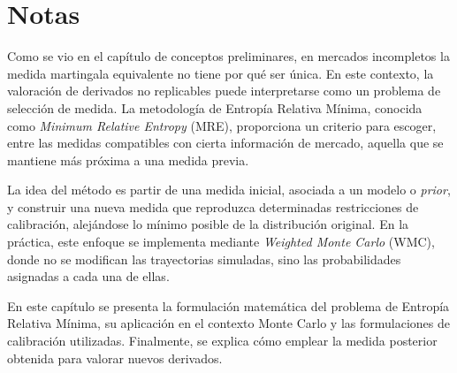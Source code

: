 \chapter{Notas}


Como se vio en el capítulo de conceptos preliminares, en mercados incompletos la medida martingala equivalente no tiene por qué ser única. En este contexto, la valoración de derivados no replicables puede interpretarse como un problema de selección de medida. La metodología de Entropía Relativa Mínima, conocida como \textit{Minimum Relative Entropy} (MRE), proporciona un criterio para escoger, entre las medidas compatibles con cierta información de mercado, aquella que se mantiene más próxima a una medida previa.\medskip

La idea del método es partir de una medida inicial, asociada a un modelo o \textit{prior}, y construir una nueva medida que reproduzca determinadas restricciones de calibración, alejándose lo mínimo posible de la distribución original. En la práctica, este enfoque se implementa mediante \textit{Weighted Monte Carlo} (WMC), donde no se modifican las trayectorias simuladas, sino las probabilidades asignadas a cada una de ellas.\medskip

En este capítulo se presenta la formulación matemática del problema de Entropía Relativa Mínima, su aplicación en el contexto Monte Carlo y las formulaciones de calibración utilizadas. Finalmente, se explica cómo emplear la medida posterior obtenida para valorar nuevos derivados.